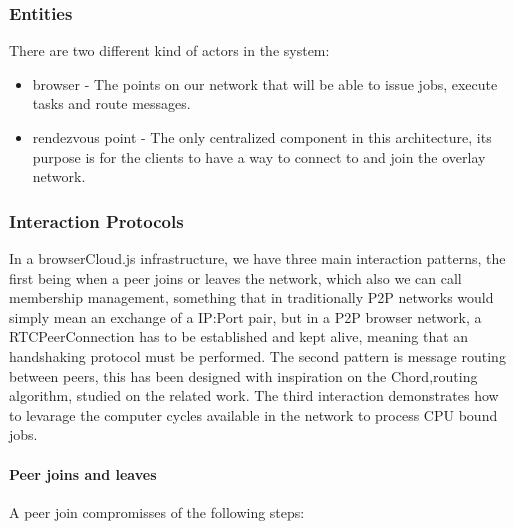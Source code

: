 \subsubsection{Entities}

There are two different kind of actors in the system:

\begin{itemize}
    \item browser - The points on our network that will be able to issue jobs, execute tasks and route messages.
    \item rendezvous point - The only centralized component in this architecture, its purpose is for the clients to have a way to connect to and join the overlay network.
\end{itemize}

\subsubsection{Interaction Protocols}

In a browserCloud.js infrastructure, we have three main interaction patterns, the first being when a peer joins or leaves the network, which also we can call membership management, something that in traditionally P2P networks would simply mean an exchange of a IP:Port pair, but in a P2P browser network, a RTCPeerConnection has to be established and kept alive, meaning that an handshaking protocol must be performed. The second pattern is message routing between peers, this has been designed with inspiration on the Chord\cite{Stoica2001},routing algorithm, studied on the related work. The third interaction demonstrates how to levarage the computer cycles available in the network to process CPU bound jobs.

\paragraph{Peer joins and leaves}

A peer join compromisses of the following steps:

